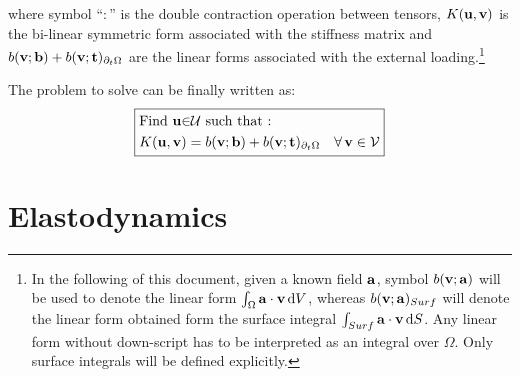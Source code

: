 \documentclass{report}
\newcommand{\bb}{\textbf{b}}
\newcommand{\bu}{\textbf{u}}
\newcommand{\bv}{\textbf{v}}
\newcommand{\bt}{\boldsymbol t}
\def\ba{{\bf{a}}}
\def\bb{{\bf{b}}}
\def\bt{{\bf t}}
\def\bu{{\bf{u}}}
\def\bv{{\bf{v}}}
\begin{document}
where symbol ``$:$'' is the double contraction operation between
tensors, $K(\bu,\bv)$
is the bi-linear symmetric form associated with the stiffness matrix
and $b(\bv;\bb)+b(\bv;\bt)_{\partial_{t}\Omega}$ are the linear forms
associated with the external loading.\footnote{In the following of this document, given a known field $\ba$, symbol
$b(\bv;\ba)$ will be used to denote the linear form $\int_{\Omega}\ba\cdot\bv\,{\rm d}V$,
whereas $b(\bv;\ba)_{Surf}$ will denote the linear form obtained
form the surface integral $\int_{Surf}\ba\cdot\bv\,{\rm d}S$. Any
linear form without down-script has to be interpreted as an integral
over $\Omega$. Only surface integrals will be defined
explicitly.}

The problem to solve can be finally written as:
\begin{equation}
\boxed{\begin{aligned} & \text{Find \ensuremath{\bu}\ensuremath{\in}\ensuremath{\mathcal{U}} such that : }\\
 & K(\bu,\bv)=b(\bv;\bb)+b(\bv;\bt)_{\partial_{t}\Omega}\quad\forall\,\bv\in\mathcal{V}
\end{aligned}
}
\end{equation}

\section{Elastodynamics}
\end{document}
